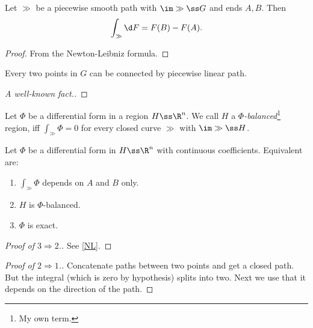 \begin{lemma}
  Let $\gg$ be a piecewise smooth path with $\im \gg \ss G$ and ends $A, B$. Then
  \begin{equation}
    \label{NL}
    \int_\gg \d F = F(B) - F(A).
  \end{equation}
\end{lemma}

\begin{proof}
  From the Newton-Leibniz formula.
\end{proof}

\begin{theorem}
  Every two points in $G$ can be connected by piecewise linear path.  
\end{theorem}

\begin{proof}[A well-known fact.]
\end{proof}

\begin{definition}
  Let $\Phi$ be a differential form in a region $H \ss \R^n$.
  We call $H$ a \emph{$\Phi$-balanced}\footnote{My own term.} region, iff
  $ \int_\gg \Phi = 0 $
  for every closed curve $\gg$ with $\im \gg \ss H$.
\end{definition}

\begin{theorem}
  Let $\Phi$ be a differential form in $H \ss \R^n$ with continuous coefficients. Equivalent are:
  \begin{enumerate}
    \item $\int_\gg \Phi$ depends on $A$ and $B$ only.
    \item $H$ is $\Phi$-balanced.
    \item $\Phi$ is exact. 
  \end{enumerate} 
\end{theorem}

\begin{proof}[Proof of $3 \Rightarrow 2$.]
  See \eqref{NL}.
\end{proof}

\begin{proof}[Proof of $2 \Rightarrow 1$.]
  Concatenate paths between two points and get a closed path. But the integral (which is zero by hypothesis) splits into two. Next we use that it depends on the direction of the path.
\end{proof}

